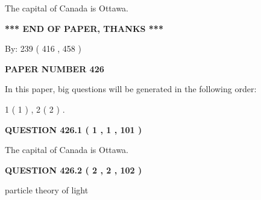 \documentclass[12pt]{article}
\begin{document}
 
\noindent{}
 
 
The capital of Canada is Ottawa.
 
 
 
 
   
   
\vspace{1.0in} 
{\textbf{\large{ *** END OF PAPER, THANKS *** }}} 
   
   
\hspace{1.0in} By: 
 239 ( 416 ,  458 )
   
   
   
   
\newpage 
\setcounter{page}{ 
   426001 } 
   
   
   
   
 {\textbf{ \Large{ PAPER NUMBER  426  }}}
   
   
\vspace{0.2in}
   
   
   
   
   
\vspace{0.2in}
   
In this paper, big questions will be generated in the following order: 
   
   
   1 ( 1 )
 ,
   2 ( 2 )
 .
  
\vspace{0.2in}
  
{\textbf{\Large{QUESTION
426.1 
 ( 1 , 1 , 101 )
}}}
  
  
 
 
\noindent{}
 
 
The capital of Canada is Ottawa.
 
 
 
 
  
\vspace{0.2in}
  
{\textbf{\Large{QUESTION
426.2 
 ( 2 , 2 , 102 )
}}}
  
  
 
 
\noindent{}
 
 
particle theory of light
 
\end{document}
